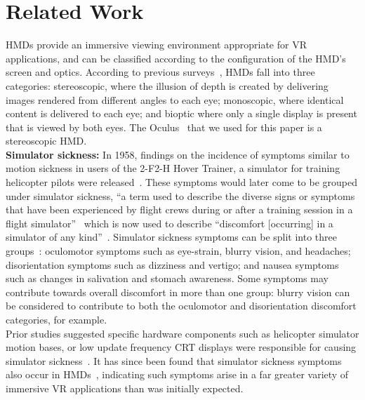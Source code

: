 \section{Related Work}

HMDs provide an immersive viewing environment appropriate for VR applications, and can be classified according to the configuration of the HMD's screen and optics. According to previous surveys~\cite{rolland05:1,rolland05:2}, HMDs fall into three categories: stereoscopic, where the illusion of depth is created by delivering images rendered from different angles to each eye; monoscopic, where  identical content is delivered to each eye; and bioptic where only a single display is present that is viewed by both eyes. The Oculus~\cite{OculusDK1} that we used for this paper is a stereoscopic HMD.\\

\noindent \textbf{Simulator sickness:}
In 1958, findings on the incidence of symptoms similar to motion sickness in users of the 2-F2-H Hover Trainer, a simulator for training helicopter pilots were released~\cite{miller58}. These symptoms would later come to be grouped under simulator sickness, ``a term used to describe the diverse signs or symptoms that have been experienced by flight crews during or after a training session in a flight simulator''~\cite{mccauley84} which is now used to describe ``discomfort [occurring] in a simulator of any kind''~\cite{johnson05}. Simulator sickness symptoms can be split into three groups~\cite{kennedy93}: oculomotor symptoms such as eye-strain, blurry vision, and headaches; disorientation symptoms such as dizziness and vertigo; and nausea symptoms such as changes in salivation and stomach awareness. Some symptoms may contribute towards overall discomfort in more than one group: blurry vision can be considered to contribute to both the oculomotor and disorientation discomfort categories, for example.\\

Prior studies suggested specific hardware components such as helicopter simulator motion bases, or low update frequency CRT displays were responsible for causing simulator sickness~\cite{miller58}. It has since been found that simulator sickness symptoms also occur in HMDs~\cite{howarth97}, indicating such symptoms arise in a far greater variety of immersive VR applications than was initially expected.\\

